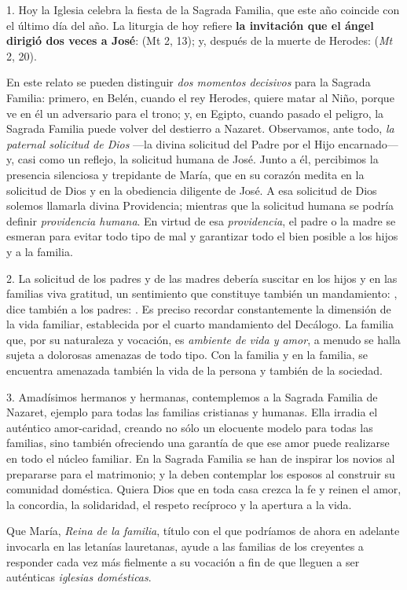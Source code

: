				\begin{body}
					1. Hoy la Iglesia celebra la fiesta de la Sagrada Familia, que este año coincide con el último día del año. La liturgia de hoy refiere \textbf{la invitación que el ángel dirigió dos veces a José}:  (Mt 2, 13); y, después de la muerte de Herodes:  (\emph{Mt} 2, 20).
					
					En este relato se pueden distinguir \emph{dos momentos decisivos} para la Sagrada Familia: primero, en Belén, cuando el rey Herodes, quiere matar al Niño, porque ve en él un adversario para el trono; y, en Egipto, cuando pasado el peligro, la Sagrada Familia puede volver del destierro a Nazaret. Observamos, ante todo, \emph{la paternal solicitud de Dios} ---la divina solicitud del Padre por el Hijo encarnado--- y, casi como un reflejo, la solicitud humana de José. Junto a él, percibimos la presencia silenciosa y trepidante de María, que en su corazón medita en la solicitud de Dios y en la obediencia diligente de José. A esa solicitud de Dios solemos llamarla divina Providencia; mientras que la solicitud humana se podría definir \emph{providencia humana}. En virtud de esa \emph{providencia}, el padre o la madre se esmeran para evitar todo tipo de mal y garantizar todo el bien posible a los hijos y a la familia.
					
					2. La solicitud de los padres y de las madres debería suscitar en los hijos y en las familias viva gratitud, un sentimiento que constituye también un mandamiento: , dice también a los padres: . Es preciso recordar constantemente la dimensión de la vida familiar, establecida por el cuarto mandamiento del Decálogo. La familia que, por su naturaleza y vocación, es \emph{ambiente de vida y amor}, a menudo se halla sujeta a dolorosas amenazas de todo tipo. Con la familia y en la familia, se encuentra amenazada también la vida de la persona y también de la sociedad.
					
					3. Amadísimos hermanos y hermanas, contemplemos a la Sagrada Familia de Nazaret, ejemplo para todas las familias cristianas y humanas. Ella irradia el auténtico amor-caridad, creando no sólo un elocuente modelo para todas las familias, sino también ofreciendo una garantía de que ese amor puede realizarse en todo el núcleo familiar. En la Sagrada Familia se han de inspirar los novios al prepararse para el matrimonio; y la deben contemplar los esposos al construir su comunidad doméstica. Quiera Dios que en toda casa crezca la fe y reinen el amor, la concordia, la solidaridad, el respeto recíproco y la apertura a la vida.
					
					Que María, \emph{Reina de la familia}, título con el que podríamos de ahora en adelante invocarla en las letanías lauretanas, ayude a las familias de los creyentes a responder cada vez más fielmente a su vocación a fin de que lleguen a ser auténticas \emph{iglesias domésticas}.
				\end{body}
			
